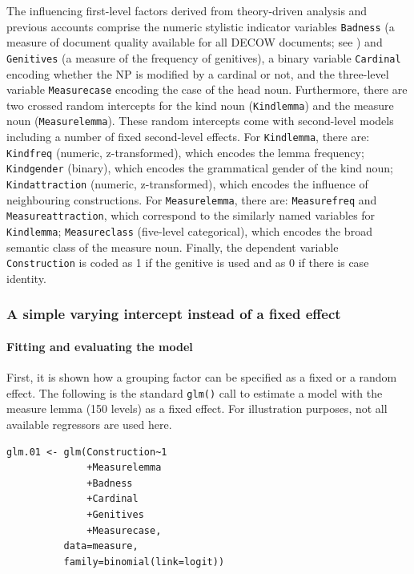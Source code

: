 The influencing first-level factors derived from theory-driven analysis and previous accounts comprise the numeric stylistic indicator variables \texttt{Badness} (a measure of document quality available for all DECOW documents; see \citealt{SchaeferEa2013}) and \texttt{Genitives} (a measure of the frequency of genitives), a binary variable \texttt{Cardinal} encoding whether the NP is modified by a cardinal or not, and the three-level variable \texttt{Measurecase} encoding the case of the head noun.
Furthermore, there are two crossed random intercepts for the kind noun (\texttt{Kindlemma}) and the measure noun (\texttt{Measurelemma}).
These random intercepts come with second-level models including a number of fixed second-level effects.
For \texttt{Kindlemma}, there are: \texttt{Kindfreq} (numeric, z-transformed), which encodes the lemma frequency; \texttt{Kindgender} (binary), which encodes the grammatical gender of the kind noun; \texttt{Kindattraction} (numeric, z-transformed), which encodes the influence of neighbouring constructions.
For \texttt{Measurelemma}, there are: \texttt{Measurefreq} and \texttt{Measureattraction}, which correspond to the similarly named variables for \texttt{Kindlemma}; \texttt{Measureclass} (five-level categorical), which encodes the broad semantic class of the measure noun.
Finally, the dependent variable \texttt{Construction} is coded as 1 if the genitive is used and as 0 if there is case identity.

\subsubsection{A simple varying intercept instead of a fixed effect}

\paragraph{Fitting and evaluating the model}

First, it is shown how a grouping factor can be specified as a fixed or a random effect.
The following is the standard \texttt{glm()} call to estimate a model with the measure lemma (150 levels) as a fixed effect.
For illustration purposes, not all available regressors are used here.

\vspace{0.5\baselineskip}

\begin{lstlisting}
glm.01 <- glm(Construction~1
              +Measurelemma
              +Badness
              +Cardinal
              +Genitives
              +Measurecase,
	      data=measure,
	      family=binomial(link=logit))
\end{lstlisting}

